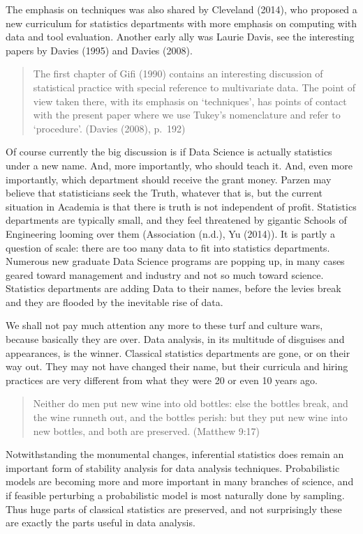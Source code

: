 \documentclass[
  12pt,
  letterpaper,
  DIV=11,
  numbers=noendperiod]{scrreprt}
\begin{document}
The emphasis on techniques was also shared by Cleveland (2014), who
proposed a new curriculum for statistics departments with more emphasis
on computing with data and tool evaluation. Another early ally was
Laurie Davis, see the interesting papers by Davies (1995) and Davies
(2008).

\begin{quote}
The first chapter of Gifi (1990) contains an interesting discussion of
statistical practice with special reference to multivariate data. The
point of view taken there, with its emphasis on `techniques', has points
of contact with the present paper where we use Tukey's nomenclature and
refer to `procedure'. (Davies (2008), p.~192)
\end{quote}

Of course currently the big discussion is if Data Science is actually
statistics under a new name. And, more importantly, who should teach it.
And, even more importantly, which department should receive the grant
money. Parzen may believe that statisticians seek the Truth, whatever
that is, but the current situation in Academia is that there is truth is
not independent of profit. Statistics departments are typically small,
and they feel threatened by gigantic Schools of Engineering looming over
them (Association (n.d.), Yu (2014)). It is partly a question of scale:
there are too many data to fit into statistics departments. Numerous new
graduate Data Science programs are popping up, in many cases geared
toward management and industry and not so much toward science.
Statistics departments are adding Data to their names, before the levies
break and they are flooded by the inevitable rise of data.

We shall not pay much attention any more to these turf and culture wars,
because basically they are over. Data analysis, in its multitude of
disguises and appearances, is the winner. Classical statistics
departments are gone, or on their way out. They may not have changed
their name, but their curricula and hiring practices are very different
from what they were 20 or even 10 years ago.

\begin{quote}
Neither do men put new wine into old bottles: else the bottles break,
and the wine runneth out, and the bottles perish: but they put new wine
into new bottles, and both are preserved. (Matthew 9:17)
\end{quote}

Notwithstanding the monumental changes, inferential statistics does
remain an important form of stability analysis for data analysis
techniques. Probabilistic models are becoming more and more important in
many branches of science, and if feasible perturbing a probabilistic
model is most naturally done by sampling. Thus huge parts of classical
statistics are preserved, and not surprisingly these are exactly the
parts useful in data analysis.
\end{document}
